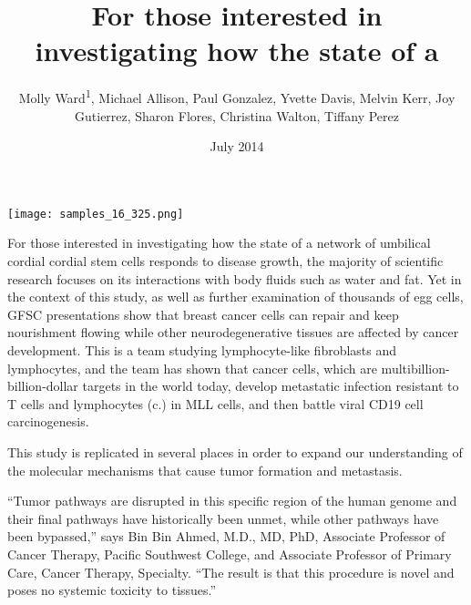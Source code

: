 \documentclass{article}
\title{For those interested in investigating how the state of a}
\author{Molly Ward\textsuperscript{1},  Michael Allison,  Paul Gonzalez,  Yvette Davis,  Melvin Kerr,  Joy Gutierrez,  Sharon Flores,  Christina Walton,  Tiffany Perez}
\affil{\textsuperscript{1}Louisiana State University}
\date{July 2014}
\begin{document}
\maketitle

\begin{center}
\begin{minipage}{0.75\linewidth}
\texttt{[image: samples\_16\_325.png]}
\end{minipage}
\end{center}

For those interested in investigating how the state of a network of umbilical cordial cordial stem cells responds to disease growth, the majority of scientific research focuses on its interactions with body fluids such as water and fat. Yet in the context of this study, as well as further examination of thousands of egg cells, GFSC presentations show that breast cancer cells can repair and keep nourishment flowing while other neurodegenerative tissues are affected by cancer development. This is a team studying lymphocyte-like fibroblasts and lymphocytes, and the team has shown that cancer cells, which are multibillion-billion-dollar targets in the world today, develop metastatic infection resistant to T cells and lymphocytes (c.) in MLL cells, and then battle viral CD19 cell carcinogenesis.

This study is replicated in several places in order to expand our understanding of the molecular mechanisms that cause tumor formation and metastasis.

“Tumor pathways are disrupted in this specific region of the human genome and their final pathways have historically been unmet, while other pathways have been bypassed,” says Bin Bin Ahmed, M.D., MD, PhD, Associate Professor of Cancer Therapy, Pacific Southwest College, and Associate Professor of Primary Care, Cancer Therapy, Specialty. “The result is that this procedure is novel and poses no systemic toxicity to tissues.”
\end{document}
